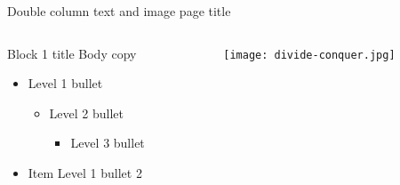 \documentclass[t]{beamer}
\begin{document}
\begin{frame}{Double column text and image page title}
	\begin{columns}[T,totalwidth=\textwidth]
  		\begin{column}{0.45\textwidth}
  			\begin{block}{Block 1 title}
    				Body copy
    				\begin{itemize}    
    					\item Level 1 bullet
  					\begin{itemize}
  						\item Level 2 bullet
  						\begin{itemize}
  							\item Level 3 bullet
  						\end{itemize}
  					\end{itemize}
    					\item Item Level 1 bullet 2
    				\end{itemize}  
			\end{block}
  		\end{column} %
  		\begin{column}{0.45\textwidth}
			\begin{figure} 
				\vspace{-\blocktitlesize}
				\texttt{[image: divide-conquer.jpg]}
			\end{figure}
  		\end{column}%
	\end{columns}
\end{frame}
\end{document}
